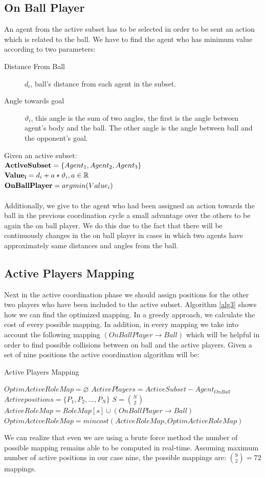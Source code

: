 \subsection{On Ball Player}
An agent from the active subset has to be selected in order to be sent an action which is related to the ball. We have to find the agent who has minimum value according to two parameters:
\begin{description}
\item[Distance From Ball]$d_{i}$, ball's distance from each agent in the subset. 
\item[Angle towards goal]$\vartheta_{i}$, this angle is the sum of two angles, the first is the angle between agent's body and the ball. The other angle is the angle between ball and the opponent's goal.
\end{description}
Given an active subset:\\
${\bf ActiveSubset} = \lbrace Agent_{1},Agent_{2},Agent_{3} \rbrace $\\
${\bf Value_{i}} = d_{i} + a \ast \vartheta_{i}, a\in\mathbb{R}$\\
${\bf OnBallPlayer} = argmin(Value_{i}) $\\
\\Additionally, we give to the agent who had been assigned an action towards the ball in the previous coordination cycle a small
advantage over the others to be again the on ball player. We do this due to the fact that there will be continuously changes in the on ball player in cases in which two agents have approximately same distances and angles from the ball.
\subsection{Active Players Mapping}
Next in the active coordination phase we should assign positions for the other two players who have been included to the active subset. Algorithm \ref{alg3} shows how we can find the optimized mapping. In a greedy approach, we calculate the cost of every possible mapping. In addition, in every mapping we take into account the following mapping $(OnBallPlayer \rightarrow Ball)$ which will be helpful in order to find possible collisions between on ball and the active players. Given a set of nine positions the active coordination algorithm will be:
\begin{algorithm}[htb!]
\caption{Active Players Mapping}
\label{alg3}
\begin{algorithmic}[1]
\STATE $OptimActiveRoleMap = \varnothing $
\STATE $ActivePlayers = ActiveSubset - Agent_{OnBall} $
\STATE $Activepositions = \lbrace P_{1},P_{2},...,P_{N} \rbrace $
\STATE $S = {{N}\choose{2}}$
\STATE $ActiveRoleMap = RoleMap[s] \cup (OnBallPlayer \rightarrow Ball)$
\STATE $OptimActiveRoleMap = mincost(ActiveRoleMap,OptimActiveRoleMap)$
\ENDFOR
\end{algorithmic}
\end{algorithm}
We can realize that even we are using a brute force method the number of possible mapping remains able to be computed in real-time. Assuming maximum number of active positions in our case nine, the possible mappings are: ${{9}\choose{2}} = 72$ mappings.

